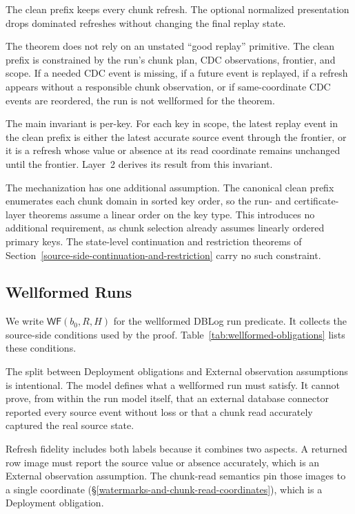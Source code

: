 \documentclass[letterpaper,10pt,twocolumn]{article}
\newcommand{\WF}{\mathsf{WF}}
\begin{document}
The clean prefix keeps every chunk refresh. The optional normalized
presentation drops dominated refreshes without changing the final
replay state.

The theorem does not rely on an unstated ``good replay'' primitive. The
clean prefix is constrained by the run's chunk plan, CDC observations,
frontier, and scope. If a needed CDC event is missing, if a future event
is replayed, if a refresh appears without a responsible chunk
observation, or if same-coordinate CDC events are reordered, the run is
not wellformed for the theorem.

The main invariant is per-key. For each key in scope, the
latest replay event in the clean prefix is either the latest accurate
source event through the frontier, or it is a refresh whose value or
absence at its read coordinate remains unchanged until the frontier.
Layer~2 derives its result from this invariant.

The mechanization has one additional assumption. The canonical clean
prefix enumerates each chunk domain in sorted key
order, so the run- and certificate-layer theorems assume a linear
order on the key type. This introduces no additional requirement, as chunk
selection already assumes linearly ordered primary keys. The state-level continuation and
restriction theorems of
Section~\ref{source-side-continuation-and-restriction} carry no such
constraint.

\subsection{Wellformed Runs}\label{wellformed-runs}

We write $\WF(b_0,R,H)$ for the wellformed DBLog run predicate. It
collects the source-side conditions used by the proof.
Table~\ref{tab:wellformed-obligations} lists these conditions.

The split between Deployment obligations and External observation
assumptions is intentional. The model defines what a wellformed run
must satisfy. It cannot prove, from within the run model itself, that an external
database connector reported every source event without loss or that a chunk
read accurately captured the real source state.

Refresh fidelity includes both labels because it combines two aspects. A
returned row image must report the source value or absence accurately,
which is an External observation assumption. The chunk-read semantics
pin those images to a single coordinate
(\S\ref{watermarks-and-chunk-read-coordinates}), which is a Deployment
obligation.
\end{document}
